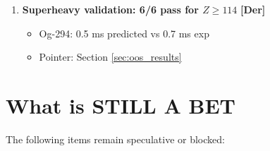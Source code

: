\documentclass[11pt,a4paper]{article}
\newcommand{\tagDer}{\textcolor{green!50!black}{\textbf{[Der]}}}
\begin{document}
\begin{enumerate}
    \item \textbf{Superheavy validation: 6/6 pass for $Z \geq 114$} \tagDer{}
    \begin{itemize}[nosep]
        \item Og-294: 0.5 ms predicted vs 0.7 ms exp
        \item Pointer: Section \ref{sec:oos_results}
    \end{itemize}
\end{enumerate}

\section{What is STILL A BET}
\label{sec:what_bet}

The following items remain speculative or blocked:
\end{document}
